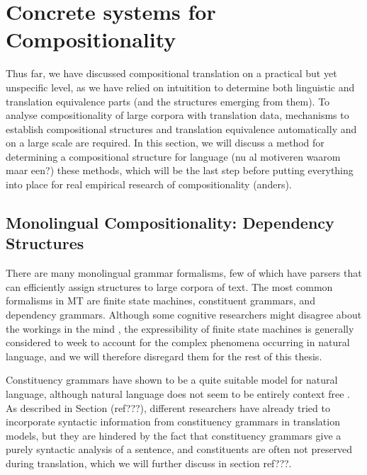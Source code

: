 \documentclass{report}
\theoremstyle{break}
\begin{document}
%

\section{Concrete systems for Compositionality}

Thus far, we have discussed compositional translation on a practical but yet unspecific level, as we have relied on intuitition to determine both linguistic and translation equivalence parts (and the structures emerging from them). To analyse compositionality of large corpora with translation data, mechanisms to establish compositional structures and translation equivalence automatically and on a large scale are required. In this section, we will discuss a method for determining a compositional structure for language (nu al motiveren waarom maar een?)
 these methods, which will be the last step before putting everything into place for real empirical research of compositionality (anders).

\subsection{Monolingual Compositionality: Dependency Structures}

There are many monolingual grammar formalisms, few of which have parsers that can efficiently assign structures to large corpora of text. The most common formalisms in MT are finite state machines, constituent grammars, and dependency grammars. Although some cognitive researchers might disagree about the workings in the mind \citep[e.g.]{frank2012hierarchical}, the expressibility of finite state machines is generally considered to week to account for the complex phenomena occurring in natural language, and we will therefore disregard them for the rest of this thesis.

Constituency grammars have shown to be a quite suitable model for natural language, although natural language does not seem to be entirely context free \citep{shieber1987evidence}. As described in Section (ref???), different researchers have already tried to incorporate syntactic information from constituency grammars in translation models, but they are hindered by the fact that constituency grammars give a purely syntactic analysis of a sentence, and constituents are often not preserved during translation, which we will further discuss in section ref???.
\end{document}
